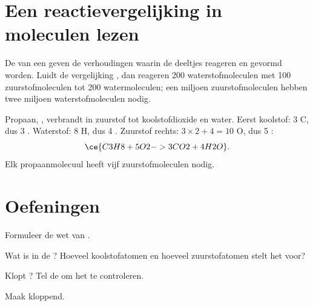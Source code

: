 \section{Een reactievergelijking in moleculen lezen}


\begin{proposition}\label{prop:g8:balanced-equations:molecules}
De  van een  geven de
verhoudingen waarin de deeltjes reageren en gevormd worden. Luidt de
vergelijking , dan reageren 200 waterstofmoleculen
met 100 zuurstofmoleculen tot 200 watermoleculen; een miljoen
zuurstofmoleculen hebben twee miljoen waterstofmoleculen nodig.
\end{proposition}

\begin{example}\label{ex:g8:balanced-equations:propane}
Propaan, , verbrandt in zuurstof tot koolstofdioxide en water.
Eerst koolstof: 3 C, dus 3 . Waterstof: 8 H, dus 4 .
Zuurstof rechts: $3 \times 2 + 4 = 10$ O, dus 5 :
\[
  \ce{C3H8 + 5O2 -> 3CO2 + 4H2O}.
\]
Elk propaanmolecuul heeft vijf zuurstofmoleculen nodig.
\end{example}

\section{Oefeningen}

\begin{exercise}[$\star$]\label{exo:g8:balanced-equations:1}
Formuleer de wet van .
\end{exercise}

\begin{exercise}[$\star$]\label{exo:g8:balanced-equations:2}
Wat is in  de ? Hoeveel koolstofatomen en hoeveel
zuurstofatomen stelt het voor?
\end{exercise}

\begin{exercise}[$\star$]\label{exo:g8:balanced-equations:3}
Klopt ? Tel de  om het te controleren.
\end{exercise}

\begin{exercise}[$\star$]\label{exo:g8:balanced-equations:4}
Maak  kloppend. %
\end{exercise}


